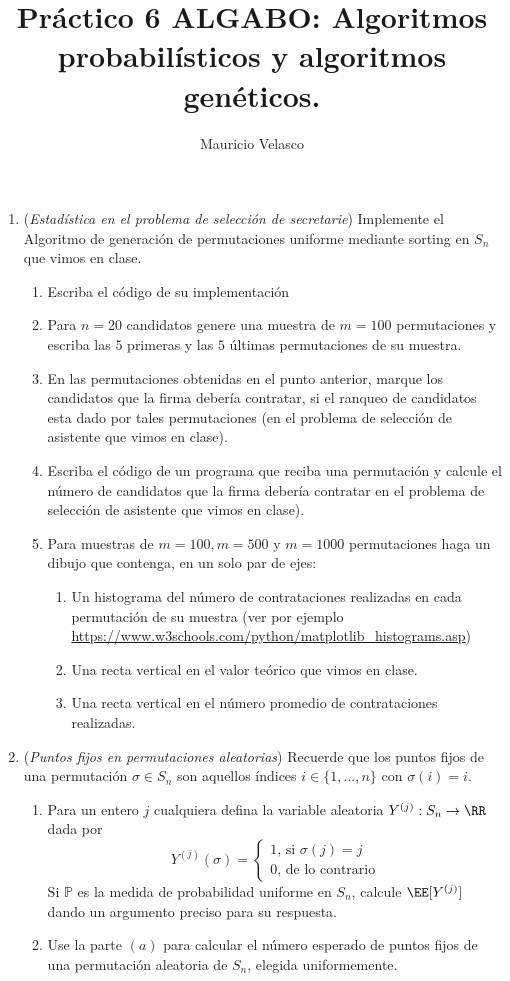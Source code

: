 \documentclass[12pt, a4paper]{article}
\date{}
\begin{document}
\title{Pr\'actico 6 ALGABO: Algoritmos probabilísticos y algoritmos genéticos.}
\author{Mauricio Velasco}
\maketitle{}
\begin{enumerate}
\item ({\it Estadística en el problema de selección de secretarie}) Implemente el Algoritmo de generación de permutaciones uniforme mediante sorting en $S_n$ que vimos en clase. 
\begin{enumerate}
\item Escriba el código de su implementación
\item Para $n=20$ candidatos genere una muestra de $m=100$ permutaciones y escriba las $5$ primeras y las $5$ últimas permutaciones de su muestra.
\item En las permutaciones obtenidas en el punto anterior, marque los candidatos que la firma debería contratar, si el ranqueo de candidatos esta dado por tales permutaciones (en el problema de selección de asistente que vimos en clase).
\item Escriba el código de un programa que reciba una permutación y calcule el número de candidatos que la firma debería contratar en el problema de selección de asistente que vimos en clase).
\item Para muestras de $m=100,m=500$ y $m=1000$ permutaciones haga un dibujo que contenga, en un solo par de ejes:
\begin{enumerate}
\item Un histograma del número de contrataciones  realizadas en cada permutación de su muestra (ver por ejemplo \url{https://www.w3schools.com/python/matplotlib_histograms.asp})
\item Una recta vertical en el valor teórico que vimos en clase.
\item Una recta vertical en el número promedio de contrataciones realizadas.
\end{enumerate}

\end{enumerate}



\item ({\it Puntos fijos en permutaciones aleatorias}) Recuerde que los puntos fijos de una permutación $\sigma\in S_n$ son aquellos índices $i\in \{1,\dots, n\}$ con $\sigma(i)=i$.
\begin{enumerate}
\item Para un entero $j$ cualquiera defina la variable aleatoria $Y^{(j)}:S_n\rightarrow \RR$ dada por
\[Y^{(j)}(\sigma)=
\begin{cases}
1\text{, si $\sigma(j)=j$}\\
0\text{, de lo contrario}
\end{cases}
\]
Si $\mathbb{P}$ es la medida de probabilidad uniforme en $S_n$, calcule $\EE[Y^{(j)}]$ dando un argumento preciso para su respuesta.
\item Use la parte $(a)$ para calcular el número esperado de puntos fijos de una permutación aleatoria de $S_n$, elegida uniformemente.
\end{enumerate}


\end{enumerate}
\end{document}
